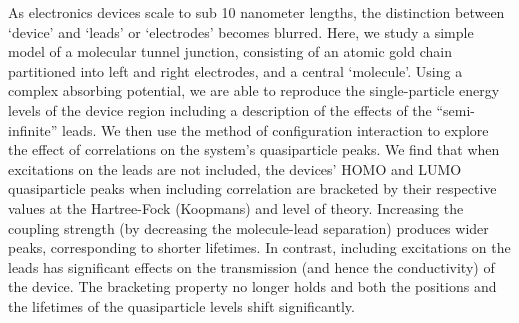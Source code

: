 As electronics devices scale to sub 10 nanometer lengths, the distinction
between `device' and `leads' or `electrodes' becomes blurred.
Here, we study a simple model of a molecular tunnel junction, consisting
of an atomic gold chain partitioned into left and right electrodes, and a
central `molecule'.
Using a complex absorbing potential, we are able to reproduce the
single-particle energy levels of the device region including a description
of the effects of the ``semi-infinite'' leads.
We then use the method of configuration interaction to explore the effect
of correlations on the system's quasiparticle peaks.
We find that when excitations on the leads are not included, the devices'
\ac{HOMO} and \ac{LUMO} quasiparticle peaks when including correlation
are bracketed by their respective values at the Hartree-Fock (Koopmans)
and \dscf level of theory.
Increasing the coupling strength (by decreasing the molecule-lead
separation) produces wider peaks, corresponding to shorter lifetimes.
In contrast, including excitations on the leads has significant effects
on the transmission (and hence the conductivity) of the device. The
bracketing property no longer holds and both the positions and the lifetimes
of the quasiparticle levels shift significantly.
